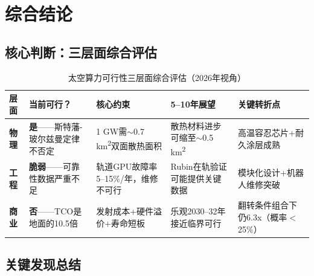 
\section{综合结论}

\subsection{核心判断：三层面综合评估}

\begin{table}[H]
\centering
\caption{太空算力可行性三层面综合评估（2026年视角）}
\label{tab:overall}
\small
\begin{tabular}{p{1.5cm}p{2.5cm}p{3.2cm}p{3.0cm}p{3.0cm}}
\toprule
\textbf{层面} & \textbf{当前可行？} & \textbf{核心约束} & \textbf{5--10年展望} & \textbf{关键转折点} \\
\midrule
\textbf{物理} & \textbf{是}——斯特藩-玻尔兹曼定律不否定 & 1 GW需$\sim$0.7 km\textsuperscript{2}双面散热面积 & 散热材料进步可缩至$\sim$0.5 km\textsuperscript{2} & 高温容忍芯片+耐久涂层成熟 \\
\hline
\textbf{工程} & \textbf{脆弱}——可靠性数据严重不足 & 轨道GPU故障率5--15\%/年，维修不可行 & Rubin在轨验证可能提供关键数据 & 模块化设计+机器人维修突破 \\
\hline
\textbf{商业} & \textbf{否}——TCO是地面的10.5倍 & 发射成本+硬件溢价+寿命短板 & 乐观2030--32年接近临界可行 & 翻转条件组合下仍6.3x（概率$<$25\%） \\
\bottomrule
\end{tabular}
\end{table}

\subsection{关键发现总结}

